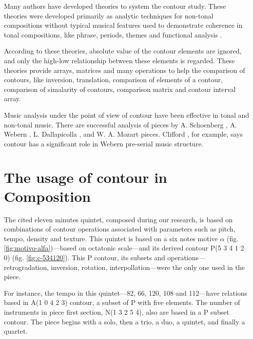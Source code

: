 Many authors
\cite{friedmann85:methodology,friedmann87:response,morris87:composition,morris93:directions,marvin.ea87:relating,marvin88:generalized,marvin.ea95:generalization,polansky.ea92:possible,quinn97:fuzzy,clifford95:contour,beard03:contour}
have developed theories to system the contour study. These theories
were developed primarily as analytic techniques for non-tonal
compositions without typical musical features used to demonstrate
coherence in tonal compositions, like phrase, periods, themes and
functional analysis \cite{beard03:contour}.

According to these theories, absolute value of the contour elements
are ignored, and only the high-low relationship between these elements
is regarded.  These theories provide arrays, matrices and many
operations to help the comparison of contours, like inversion,
translation, comparison of elements of a contour, comparison of
simalarity of contours, comparison matrix and contour interval array.

Music analysis under the point of view of contour have been effective
in tonal and non-tonal music. There are successful analysis of pieces
by A. Schoenberg \cite{friedmann85:methodology}, A. Webern
\cite{clifford95:contour}, L. Dallapicolla
\cite{marvin88:generalized}, and W. A. Mozart \cite{beard03:contour}
pieces. Clifford \cite{clifford95:contour}, for example, says contour
has a significant role in Webern pre-serial music structure.

\section{The usage of contour in Composition}
\label{sec:contour-composition}

The cited eleven minutes quintet, composed during our research, is
based on combinations of contour operations associated with parameters
such as pitch, tempo, density and texture. This quintet is based on a
six notes motive $\alpha$ (fig. \ref{fig:motivo-alfa})---based on
octatonic scale---and its derived contour P(5 3 4 1 2 0)
(fig. \ref{fig:c-534120}). This P contour, its subsets and
operations---retrogradation, inversion, rotation,
interpollation---were the only one used in the piece.

For instance, the tempo in this quintet---82, 66, 120, 108 and
112---have relations based in A(1 0 4 2 3) contour, a subset of P with
five elements. The number of instruments in piece first section, N(1 3
2 5 4), also are based in a P subset contour. The piece begins with a
solo, then a trio, a duo, a quintet, and finally a quartet.

